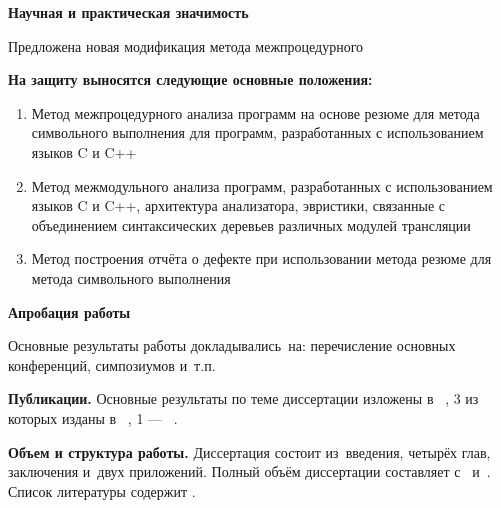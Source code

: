 \textbf{Научная и практическая значимость}

Предложена новая модификация метода межпроцедурного 

\textbf{На защиту выносятся следующие основные положения:}
\begin{enumerate}
  \item Метод межпроцедурного анализа программ на основе резюме для метода символьного выполнения для программ, разработанных с использованием языков C и C++
  \item Метод межмодульного анализа программ, разработанных с использованием языков C и C++, архитектура анализатора, эвристики, связанные с объединением синтаксических деревьев различных модулей трансляции
  \item Метод построения отчёта о дефекте при использовании метода резюме для метода символьного выполнения
\end{enumerate}


\textbf{Апробация работы}

Основные результаты работы докладывались~на:
перечисление основных конференций, симпозиумов и~т.\:п.


\textbf{Публикации.} Основные результаты по теме диссертации изложены в ~\cite{Sokolov,Gaidaenko,Lermontov,Management},
3 из которых изданы в ~\cite{Sokolov,Gaidaenko}, 
1 --- ~\cite{Lermontov,Management}.


\textbf{Объем и структура работы.} Диссертация состоит из~введения, четырёх глав, заключения и~двух приложений.
%
Полный объём диссертации составляет  
с~
и~. Список литературы содержит  
.
